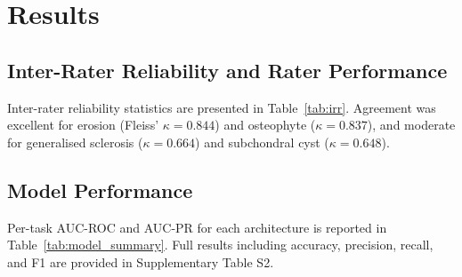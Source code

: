 \documentclass[review,12pt]{elsarticle}
\begin{document}
\section{Results}
\label{sec:results}

\subsection{Inter-Rater Reliability and Rater Performance}
\label{sec:irr_results}

Inter-rater reliability statistics are presented in
Table~\ref{tab:irr}. Agreement was excellent for erosion
(Fleiss' $\kappa = 0.844$) and osteophyte ($\kappa = 0.837$), and
moderate for generalised sclerosis ($\kappa = 0.664$) and subchondral
cyst ($\kappa = 0.648$).

\subsection{Model Performance}
\label{sec:model_results}
 
Per-task AUC-ROC and AUC-PR for each architecture is reported in
Table~\ref{tab:model_summary}. Full results including
accuracy, precision, recall, and F1 are provided in Supplementary
Table S2.
\end{document}

